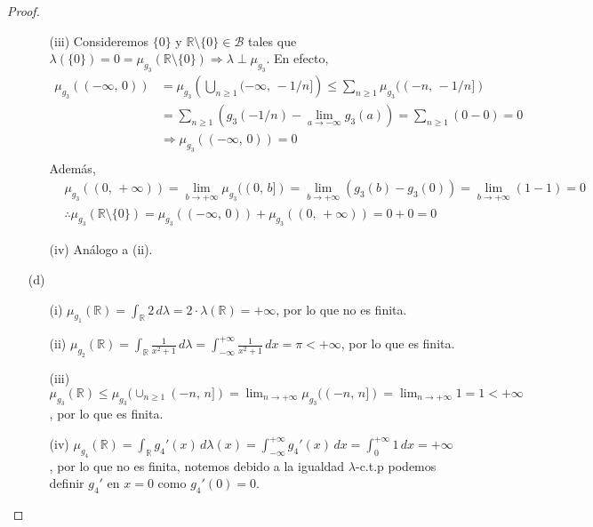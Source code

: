 \documentclass[12pt]{article}
\begin{document}
\begin{proof}
\begin{itemize}
\begin{itemize}
                  \item[(iii)] Consideremos \( \{ 0 \}  \) y \( \mathbb{R} \setminus \{ 0 \} \in \mathcal{B}  \) tales que \( \lambda( \{ 0 \}) = 0 = \mu_{g_3}(\mathbb{R} \setminus \{0\}) \Rightarrow \lambda \perp \mu_{g_3}  \). En efecto,\begin{align*}
                    \mu_{g_3}((-\infty\text{, }0)) & = \mu_{g_3}\left(\bigcup_{n \geq 1} (-\infty\text{, }-1/n] \right) \leq \sum_{n \geq 1} \mu_{g_3}((-n\text{, }-1/n]) \\
                    & = \sum_{n \geq 1} ( g_3(-1/n) - \lim_{a \to -\infty} g_3(a) ) = \sum_{n \geq 1} (0 - 0) = 0 \\
                    & \Rightarrow \mu_{g_3}((-\infty\text{, }0)) = 0 \\
                  \end{align*}
                  Además,\begin{align*}
                    & \mu_{g_3}((0\text{, }+\infty)) = \lim_{b \to +\infty} \mu_{g_3}((0\text{, }b]) = \lim_{b \to +\infty} (g_3(b) - g_3(0)) = \lim_{b \to +\infty} (1 - 1) = 0 \\
                    & \therefore \mu_{g_3}(\mathbb{R} \setminus \{ 0 \}) = \mu_{g_3}((-\infty\text{, }0)) + \mu_{g_3}((0\text{, }+\infty)) = 0 + 0 = 0 
                  \end{align*}
                  \item[(iv)] Análogo a (ii).
              \end{itemize}
        \item[(d)] \begin{itemize}
                  \item[(i)] \(\mu_{g_1}(\mathbb{R}) = \int_{\mathbb{R}} 2 \, d\lambda = 2 \cdot \lambda(\mathbb{R}) = +\infty \), por lo que no es finita.
                  \item[(ii)] \(\mu_{g_2}(\mathbb{R}) = \int_{\mathbb{R}} \frac{1}{x^2 + 1} \, d\lambda = \int_{-\infty}^{+\infty} \frac{1}{x^2 + 1} \, dx = \pi < +\infty \), por lo que es finita.
                  \item[(iii)] \(\mu_{g_3}(\mathbb{R}) \leq \mu_{g_3}(\cup_{n \geq 1} (-n\text{, }n]) = \lim_{n \to +\infty} \mu_{g_3}((-n\text{, }n]) = \lim_{n \to +\infty} 1 = 1 < +\infty \), por lo que es finita.
                  \item[(iv)] \(\mu_{g_4}(\mathbb{R}) = \int_{\mathbb{R}} g_4'(x) \, d\lambda(x) = \int_{-\infty}^{+\infty} g_4'(x) \, dx = \int_{0}^{+\infty} 1 \, dx = +\infty \), por lo que no es finita, notemos debido a la igualdad \(\lambda \)-c.t.p podemos definir \(g_4' \) en \(x=0 \) como \(g_4'(0) = 0 \).

\end{itemize}
\end{itemize}
\end{proof}
\end{document}
